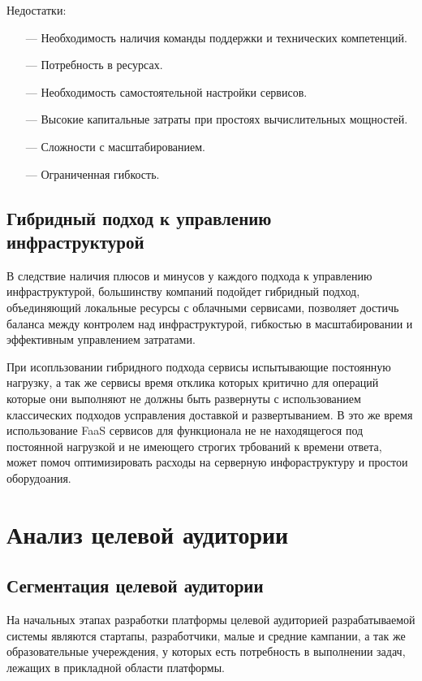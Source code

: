 Недостатки:
\begin{itemize}
    \item[---]Необходимость наличия команды поддержки и технических компетенций.
    \item[---]Потребность в ресурсах.
    \item[---]Необходимость самостоятельной настройки сервисов.
    \item[---]Высокие капитальные затраты при простоях вычислительных мощностей.
    \item[---]Сложности с масштабированием.
    \item[---]Ограниченная гибкость.
\end{itemize}

\subsection{Гибридный подход к управлению инфраструктурой}

В следствие наличия плюсов и минусов у каждого подхода к управлению инфраструктурой, большинству компаний подойдет гибридный подход, объединяющий локальные ресурсы с облачными сервисами, позволяет достичь баланса между контролем над инфраструктурой, гибкостью в масштабировании и эффективным управлением затратами.

При исопльзовании гибридного подхода сервисы испытывающие постоянную нагрузку, а так же сервисы время отклика которых критично для операций которые они выполняют не должны быть развернуты с использованием классических подходов усправления доставкой и развертыванием.
В это же время использование FaaS сервисов для функционала не не находящегося под постоянной нагрузкой и не имеющего строгих трбований к времени ответа, может помоч оптимизировать расходы на серверную инфораструктуру и простои оборудоания.

\section{Анализ целевой аудитории}

\subsection{Сегментация целевой аудитории}

На начальных этапах разработки платформы целевой аудиторией разрабатываемой системы являются стартапы, разработчики, малые и средние кампании, а так же образовательные учереждения, у которых есть потребность в выполнении задач, лежащих в прикладной области платформы.


